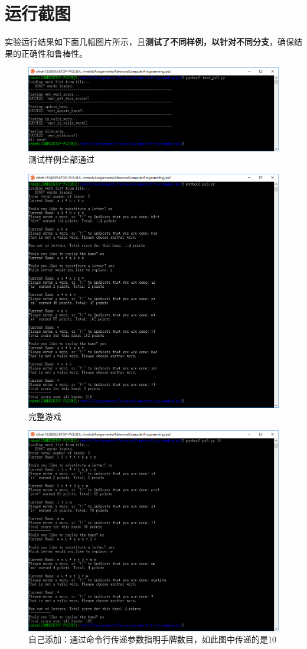 \documentclass[logo,reportComp]{thesis}
\begin{document}
\section{运行截图}
实验运行结果如下面几幅图片所示，且\textbf{测试了不同样例，以针对不同分支}，确保结果的正确性和鲁棒性。
\begin{figure}[H]
\centering
\includegraphics[width=\linewidth]{fig/test-done.PNG}
\caption{测试样例全部通过}
\end{figure}
\begin{figure}[H]
\centering
\includegraphics[width=\linewidth]{fig/game.PNG}
\caption{完整游戏}
\end{figure}
\begin{figure}[H]
\centering
\includegraphics[width=\linewidth]{fig/game-10.PNG}
\caption{自己添加：通过命令行传递参数指明手牌数目，如此图中传递的是10}
\end{figure}
\end{document}
